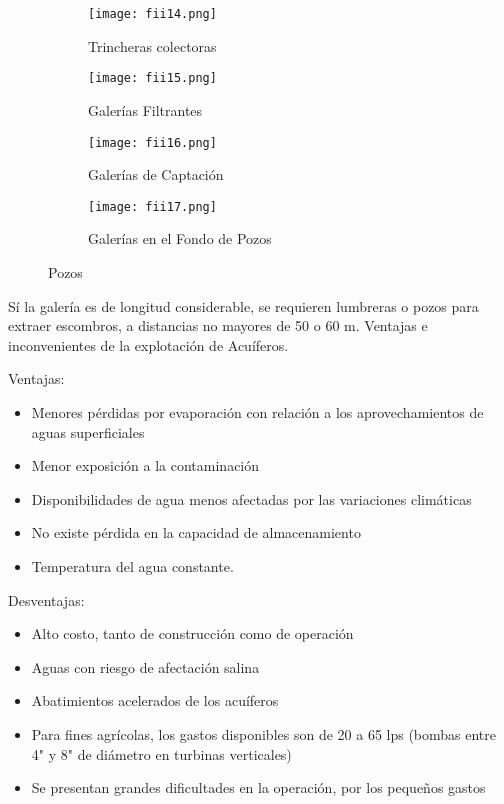 \begin{figure}[h!]
	\centering
	\begin{subfigure}[b]{0.45\linewidth}
		\texttt{[image: fii14.png]}
		\caption{Trincheras colectoras}
		\label{fii14}
	\end{subfigure}
	\begin{subfigure}[b]{0.3\linewidth}
		\texttt{[image: fii15.png]}
		\caption{Galerías Filtrantes}
		\label{fii15}
	\end{subfigure}
	\begin{subfigure}[b]{0.45\linewidth}
		\texttt{[image: fii16.png]}
		\caption{Galerías de Captación}
		\label{fii16}
	\end{subfigure}
	\begin{subfigure}[b]{0.45\linewidth}
		\texttt{[image: fii17.png]}
		\caption{Galerías en el Fondo de Pozos}
		\label{fii17}
	\end{subfigure}
	\caption{Pozos}
	\label{fig14-17}
\end{figure}

Sí la galería es de longitud considerable, se requieren lumbreras o pozos para
extraer escombros, a distancias no mayores de 50 o 60 m.
Ventajas e inconvenientes de la explotación de Acuíferos.

Ventajas:
\begin{itemize}
	\item  Menores pérdidas por evaporación con relación a los aprovechamientos de
	      aguas superficiales
	\item Menor exposición a la contaminación
	\item Disponibilidades de agua menos afectadas por las variaciones climáticas
	\item No existe pérdida en la capacidad de almacenamiento
	\item Temperatura del agua constante.
\end{itemize}

Desventajas:
\begin{itemize}
	\item  Alto costo, tanto de construcción como de operación
	\item Aguas con riesgo de afectación salina
	\item Abatimientos acelerados de los acuíferos
	\item Para fines agrícolas, los gastos disponibles son de 20 a 65 lps (bombas entre
	      4" y 8" de diámetro en turbinas verticales)
	\item Se presentan grandes dificultades en la operación, por los pequeños gastos
\end{itemize}


